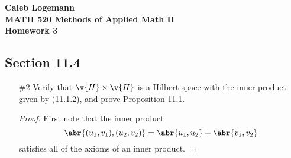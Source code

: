 \documentclass[11pt, oneside]{article}
\begin{document}
\noindent \textbf{\Large{Caleb Logemann \\
MATH 520 Methods of Applied Math II \\
Homework 3
}}

\subsection*{Section 11.4}
\begin{enumerate}
  \item[\#2] %
    Verify that $\v{H} \times \v{H}$ is a Hilbert space with the inner product
    given by (11.1.2), and prove Proposition 11.1.

    \begin{proof}
      First note that the inner product
      \[
        \abr{(u_1, v_1), (u_2, v_2)} = \abr{u_1, u_2} + \abr{v_1, v_2}
      \]
      satisfies all of the axioms of an inner product.


\end{proof}
\end{enumerate}
\end{document}

